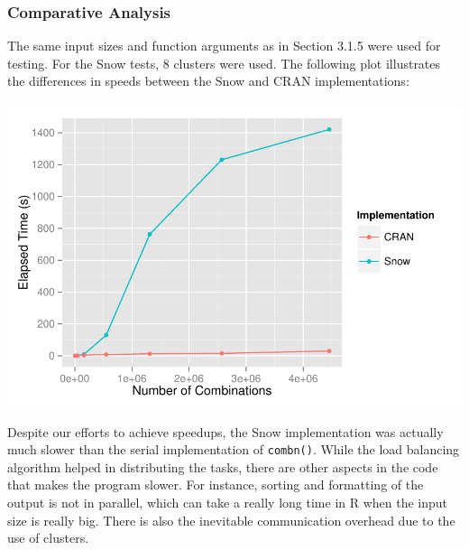 \subsubsection{Comparative Analysis}
The same input sizes and function arguments as in Section 3.1.5 were used for testing. For the Snow tests, 8 clusters were used. The following plot illustrates the differences in speeds between the Snow and CRAN implementations:\\
\null

\includegraphics{snow.pdf}\\
\null

Despite our efforts to achieve speedups, the Snow implementation was actually much slower than the serial implementation of \texttt{combn()}. While the load balancing algorithm helped in distributing the tasks, there are other aspects in the code that makes the program slower. For instance, sorting and formatting of the output is not in parallel, which can take a really long time in R when the input size is really big. There is also the inevitable communication overhead due to the use of clusters.






